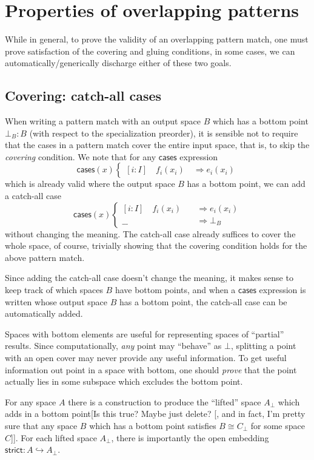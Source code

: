 \documentclass[conference]{IEEEtran}
\newcommand{\hookto}{\hookrightarrow}
\newcommand{\Branch}{\Rightarrow}
\begin{document}
\section{Properties of overlapping patterns}

While in general, to prove the validity of an overlapping pattern match, one must prove satisfaction of the covering and gluing conditions, in some cases, we can automatically/generically discharge either of these two goals. 

\subsection{Covering: catch-all cases}

When writing a pattern match with an output space $B$ which has a bottom point $\bot_B : B$ (with respect to the specialization preorder), it is sensible not to require that the cases in a pattern match cover the entire input space, that is, to skip the \emph{covering} condition. We note that for any $\mathsf{cases}$ expression
\[
\mathsf{cases}(x)
\begin{cases}
[i : I] \quad f_i(x_i) \quad \Branch e_i(x_i)
\end{cases}
\]
which is already valid where the output space $B$ has a bottom point, we can add a catch-all case
\[
\mathsf{cases}(x)
\begin{cases}
[i : I] \quad f_i(x_i) \quad &\Branch e_i(x_i)
\\ \_\_ \quad &\Branch \bot_B
\end{cases}
\]
without changing the meaning. The catch-all case already suffices to cover the whole space, of course, trivially showing that the covering condition holds for the above pattern match.

Since adding the catch-all case doesn't change the meaning, it makes sense to keep track of which spaces $B$ have bottom points, and when a $\mathsf{cases}$ expression is written whose output space $B$ has a bottom point, the catch-all case can be automatically added.

Spaces with bottom elements are useful for representing spaces of ``partial'' results. Since computationally, \emph{any} point may ``behave'' as $\bot$, splitting a point with an open cover may never provide any useful information. To get useful information out point in a space with bottom, one should \emph{prove} that the point actually lies in some subspace which excludes the bottom point.

For any space $A$ there is a construction to produce the ``lifted'' space $A_\bot$ which adds in a bottom point[Is this true? Maybe just delete? [, and in fact, I'm pretty sure that any space $B$ which has a bottom point satisfies $B \cong C_\bot$ for some space $C$]]. For each lifted space $A_\bot$, there is importantly the open embedding $\mathsf{strict} : A \hookto A_\bot$.
\end{document}
